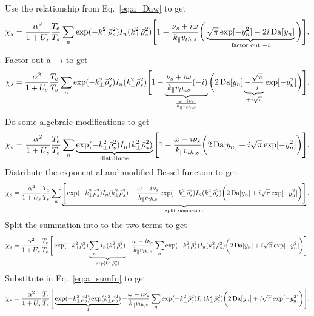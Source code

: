 Use the relationship from Eq.~\ref{eq:a_Daw} to get
\begin{equation}
	\chi_s = \frac{\alpha^2}{1+U_s} \frac{T_e}{T_s} \sum_n
	\exp(-k_\perp^2 \bar{\rho}_s^2) 
	I_n(k_\perp^2 \bar{\rho}_s^2)
	\Bigg[
	1 - \frac{\nu_s + i\omega}{k_\parallel v_{th,s}}
	\bigg(\underbrace{\sqrt{\pi} \exp[-y_n^2] - 2 i \operatorname{Da} [y_n] }_{\text{factor out }-i}  \bigg)
	\Bigg].
\end{equation}
Factor out a $-i$ to get
\begin{equation}
	\chi_s = \frac{\alpha^2}{1+U_s} \frac{T_e}{T_s} \sum_n
	\exp(-k_\perp^2 \bar{\rho}_s^2) 
	I_n(k_\perp^2 \bar{\rho}_s^2) 
	\Bigg[
	1 - \underbrace{\frac{\nu_s + i\omega}{k_\parallel v_{th,s}} (-i)}_{\frac{\omega-i\nu_s}{k_\parallel v_{th,s}}}
	\bigg( 2 \operatorname{Da} [y_n]   \underbrace{-\frac{\sqrt{\pi}}{i}}_{+i\sqrt{\pi}} \exp[-y_n^2]\bigg)
\Bigg].
\end{equation}
Do some algebraic modifications to get
\begin{equation}
	\chi_s = \frac{\alpha^2}{1+U_s} \frac{T_e}{T_s} \sum_n
	\underbrace{\exp(-k_\perp^2 \bar{\rho}_s^2) 
	I_n(k_\perp^2 \bar{\rho}_s^2) }_{\text{distribute}}
	\Bigg[
	1 - \frac{\omega-i\nu_s}{k_\parallel v_{th,s}}
	\bigg( 2 \operatorname{Da} [y_n]   +i\sqrt{\pi} \exp[-y_n^2]\bigg)
	\Bigg].
\end{equation}
Distribute the exponential and modified Bessel function to get
\begin{equation}
	\chi_s = \frac{\alpha^2}{1+U_s} \frac{T_e}{T_s} \sum_n 
	\underbrace{\Bigg[
	\exp(-k_\perp^2 \bar{\rho}_s^2) 
	I_n(k_\perp^2 \bar{\rho}_s^2)
	- \frac{\omega-i\nu_s}{k_\parallel v_{th,s}}
	\exp(-k_\perp^2 \bar{\rho}_s^2) 
	I_n(k_\perp^2 \bar{\rho}_s^2)
	\bigg( 2 \operatorname{Da} [y_n]   +i\sqrt{\pi} \exp[-y_n^2]\bigg)
	\Bigg]}_{\text{split summation}}.
\end{equation}
Split the summation into to the two terms to get
\begin{equation}
	\chi_s = \frac{\alpha^2}{1+U_s} \frac{T_e}{T_s}  
	\Bigg[
	\exp(-k_\perp^2 \bar{\rho}_s^2) 
	\underbrace{ \sum_n
	I_n(k_\perp^2 \bar{\rho}_s^2)}_{\exp(k_\perp^2 \bar{\rho}_s^2)}
	- \frac{\omega-i\nu_s}{k_\parallel v_{th,s}}
	\sum_n
	\exp(-k_\perp^2 \bar{\rho}_s^2) 
	I_n(k_\perp^2 \bar{\rho}_s^2)
	\bigg( 2 \operatorname{Da} [y_n]   +i\sqrt{\pi} \exp[-y_n^2]\bigg)
	\Bigg].
\end{equation}
Substitute in Eq.~\ref{eq:a_sumIn} to get
\begin{equation}
	\chi_s = \frac{\alpha^2}{1+U_s} \frac{T_e}{T_s}  
	\Bigg[
	\underbrace{\exp(-k_\perp^2 \bar{\rho}_s^2) 
	\exp(k_\perp^2 \bar{\rho}_s^2)}_{1}
	- \frac{\omega-i\nu_s}{k_\parallel v_{th,s}}
	\sum_n
	\exp(-k_\perp^2 \bar{\rho}_s^2) 
	I_n(k_\perp^2 \bar{\rho}_s^2)
	\bigg( 2 \operatorname{Da} [y_n]   +i\sqrt{\pi} \exp[-y_n^2]\bigg)
	\Bigg].
\end{equation}
